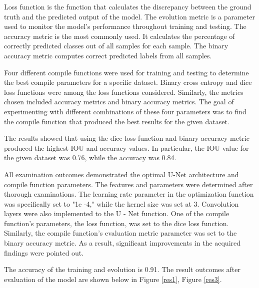 \begin{itemize}
        Loss function is the function that calculates the discrepancy between the ground truth and the predicted output of the model. The evolution metric is a parameter used to monitor the model's performance throughout training and testing. The accuracy metric is the most commonly used. It calculates the percentage of correctly predicted classes out of all samples for each sample. The binary accuracy metric computes correct predicted labels from all samples. 

        Four different compile functions were used for training and testing to determine the best compile parameters for a specific dataset. Binary cross entropy and dice loss functions were among the loss functions considered. Similarly, the metrics chosen included accuracy metrics and binary accuracy metrics. The goal of experimenting with different combinations of these four parameters was to find the compile function that produced the best results for the given dataset.

        The results showed that using the dice loss function and binary accuracy metric produced the highest IOU and accuracy values. In particular, the IOU value for the given dataset was 0.76, while the accuracy was 0.84.
\end{itemize}

All examination outcomes demonstrated the optimal U-Net architecture and compile function parameters. The features and parameters were determined after thorough examinations. The learning rate parameter in the optimization function was specifically set to "1e -4," while the kernel size was set at 3. Convolution layers were also implemented to the U - Net function. One of the compile function's parameters, the loss function, was set to the dice loss function. Similarly, the compile function's evaluation metric parameter was set to the binary accuracy metric. As a result, significant improvements in the acquired findings were pointed out.


The accuracy of the training and evolution is 0.91. The result outcomes after evaluation of the model are shown below in Figure \ref{res1}, Figure \ref{res3}.

